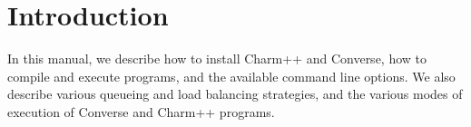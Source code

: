\newpage
\pagestyle{headings}

\section{Introduction}
In this manual, we describe how to install Charm++ and
Converse, how to compile and execute programs, and the available
command line options.  We also describe various queueing and load balancing
strategies, and the various modes of execution of Converse and Charm++
programs.






